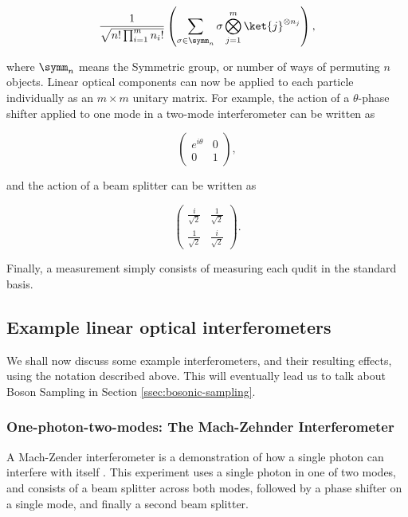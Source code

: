 \begin{equation}
\frac{1}{\sqrt{n!\prod_{i=1}^mn_i!}}\left(\sum_{\sigma\in\symm_n}\sigma\bigotimes_{j=1}^m\ket{j}^{\otimes n_j}\right),
\end{equation}

\noindent where $\symm_n$ means the Symmetric group, or number of ways of permuting $n$ objects. Linear optical components can now be applied to each particle individually as an $m \times m$ unitary matrix. For example, the action of a $\theta$-phase shifter applied to one mode in a two-mode interferometer can be written as

\begin{equation}
\begin{pmatrix}
e^{i\theta} & 0\\
0 & 1
\end{pmatrix},
\end{equation}

\noindent and the action of a beam splitter can be written as

\begin{equation}
\begin{pmatrix}
\frac{i}{\sqrt{2}} & \frac{1}{\sqrt{2}}\\
\frac{1}{\sqrt{2}} & \frac{i}{\sqrt{2}}
\end{pmatrix}.
\end{equation}

Finally, a measurement simply consists of measuring each qudit in the standard basis.

\subsection{Example linear optical interferometers}
\label{ssec:example-interferometers}

We shall now discuss some example interferometers, and their resulting effects, using the notation described above. This will eventually lead us to talk about Boson Sampling in Section \ref{ssec:bosonic-sampling}.

\subsubsection{One-photon-two-modes: The Mach-Zehnder Interferometer}

A Mach-Zender interferometer is a demonstration of how a single photon can interfere with itself \cite{zehnder1891,mach1892}. This experiment uses a single photon in one of two modes, and consists of a beam splitter across both modes, followed by a phase shifter on a single mode, and finally a second beam splitter.

